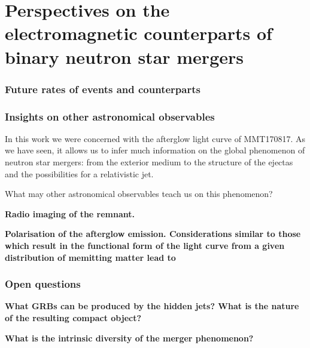 
\part{Perspectives on the electromagnetic counterparts of binary neutron star mergers}

\section{Future rates of events and counterparts}

\section{Insights on other astronomical observables}

In this work we were concerned with the afterglow light curve of MMT170817. As we have seen, it allows us to infer much information on the global phenomenon of neutron star mergers: from the exterior medium to the structure of the ejectas and the possibilities for a relativistic jet. 

What may other astronomical observables teach us on this phenomenon?

\bf{Radio imaging of the remnant.}

\bf{Polarisation of the afterglow emission.} Considerations similar to those which result in the functional form of the light curve from a given distribution of memitting matter lead to 


\section{Open questions}

\bf{What GRBs can be produced by the hidden jets? }
\bf{What is the nature of the resulting compact object? }


\bf{What is the intrinsic diversity of the merger phenomenon? }